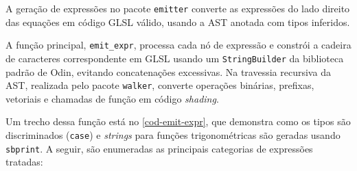 A geração de expressões no pacote \texttt{emitter} converte as expressões do lado direito das equações em código GLSL válido, usando a AST anotada com tipos inferidos.

A função principal, \verb"emit_expr", processa cada nó de expressão e constrói a cadeira de caracteres correspondente em GLSL usando um \verb"StringBuilder" da biblioteca padrão de Odin, evitando concatenações excessivas. Na travessia recursiva da AST, realizada pelo pacote \texttt{walker}, converte operações binárias, prefixas, vetoriais e chamadas de função em código \textit{shading}.

Um trecho dessa função está no \autoref{cod-emit-expr}, que demonstra como os tipos são discriminados (\texttt{case}) e \textit{strings} para funções trigonométricas são geradas usando \verb|sbprint|. A seguir, são enumeradas as principais categorias de expressões tratadas:

